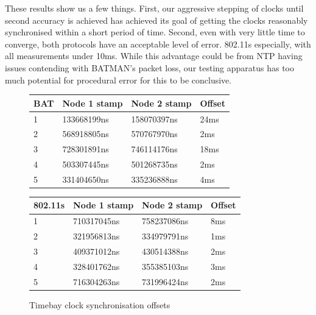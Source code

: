 \documentclass[journal]{IEEEtran}
\begin{document}
These results show us a few things. First, our aggressive stepping of clocks until second accuracy is achieved has achieved its goal of getting the clocks reasonably synchronised within a short period of time. Second, even with very little time to converge, both protocols have an acceptable level of error. 802.11s especially, with all measurements under 10ms. While this advantage could be from NTP having issues contending with BATMAN's packet loss, our testing apparatus has too much potential for procedural error for this to be conclusive.

\begin{figure}[t]
\begin{tabular}{|l|l|l|l|}
\hline
\textbf{BAT} & \textbf{Node 1 stamp} & \textbf{Node 2 stamp} & \textbf{Offset} \\ \hline
1              & 133668199ns           & 158070397ns           & 24ms            \\ \hline
2              & 568918805ns           & 570767970ns           & 2ms             \\ \hline
3              & 728301891ns           & 746114176ns           & 18ms            \\ \hline
4              & 503307445ns           & 501268735ns           & 2ms             \\ \hline
5              & 331404650ns           & 335236888ns           & 4ms             \\ \hline
\end{tabular}

\begin{tabular}{|l|l|l|l|}
\hline
\textbf{802.11s} & \textbf{Node 1 stamp} & \textbf{Node 2 stamp} & \textbf{Offset} \\ \hline
1              & 710317045ns           & 758237086ns           & 8ms            \\ \hline
2              & 321956813ns           & 334979791ns           & 1ms             \\ \hline
3              & 409371012ns           & 430514388ns           & 2ms            \\ \hline
4              & 328401762ns           & 355385103ns           & 3ms             \\ \hline
5              & 716304263ns           & 731996424ns           & 2ms             \\ \hline
\end{tabular}
\caption{Timebay clock synchronisation offsets}
\label{tab:times}
\end{figure}
\end{document}

